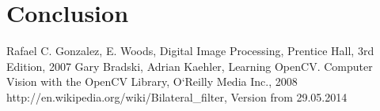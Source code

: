 \documentclass[a4paper,onecolumn,oneside,12pt]{memoir}
\begin{document}
\chapter{Conclusion}

\newpage

\begin{thebibliography}{   }

          {Rafael C. Gonzalez, E. Woods, Digital Image Processing, Prentice Hall, 3rd Edition, 2007}
          {Gary Bradski, Adrian Kaehler, Learning OpenCV. Computer Vision with the OpenCV Library,
          O`Reilly Media Inc., 2008}
          {http://en.wikipedia.org/wiki/Bilateral\_filter, Version from 29.05.2014}


\end{thebibliography}
\end{document}
